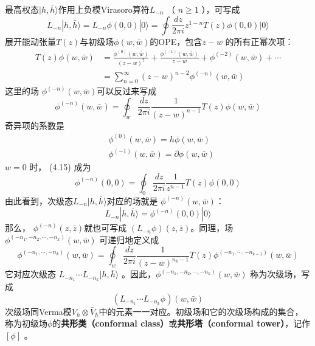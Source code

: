 最高权态$ |h,\bar{h}\rangle $作用上负模Virasoro算符$ L_{-n}$ （ $n\geq 1$ ），可写成
\begin{equation}
L_{-n}|h, \bar{h}\rangle=L_{-n} \phi(0,0)|0\rangle=\oint \frac{d z}{2 \pi i} z^{1-n} T(z) \phi(0,0)|0\rangle
\end{equation}
展开能动张量$ T(z) $与初级场$ \phi(w,\bar{w}) $的OPE，包含$ z-w$ 的所有正幂次项：
\begin{equation}
	\begin{aligned} T(z) \phi(w, \bar{w}) &=\frac{\phi^{(0)}(w, \bar{w})}{(z-w)^{2}}+\frac{\phi^{(-1)}(w, \bar{w})}{z-w}+\phi^{(-2)}(w, \bar{w})+\cdots \\ &=\sum_{n=0}^{\infty}(z-w)^{n-2} \phi^{(-n)}(w, \bar{w}) \end{aligned}
\end{equation}
这里的场 $\phi^{(-n)}(w, \bar{w}) $可以反过来写成
\begin{equation}
	\phi^{(-n)}(w, \bar{w})=\oint_{w} \frac{d z}{2 \pi i} \frac{1}{(z-w)^{n-1}} T(z) \phi(w, \bar{w})
\end{equation}
奇异项的系数是
\begin{align} &\phi^{(0)}(w, \bar{w})=h \phi(w, \bar{w})\\ &\phi^{(-1)}(w, \bar{w})=\partial \phi(w, \bar{w}) \end{align}
$w=0$ 时， (4.15) 成为
\begin{equation}
	\phi^{(-n)}(0,0)=\oint_{0} \frac{d z}{2 \pi i} \frac{1}{z^{n-1}} T(z) \phi(0,0)
\end{equation}
由此看到，次级态$ L_{-n}|h, \bar{h}\rangle$对应的场就是 $\phi^{(-n)}(w, \bar{w}) $：
\begin{equation}
	L_{-n}|h, \bar{h}\rangle=\phi^{(-n)}(0,0)|0\rangle
\end{equation}
那么， $\phi^{(-n)}(z, \bar{z}) $就也可写成 $\left(L_{-n} \phi\right)(z, \bar{z}) $。同理，场$ \phi^{\left(-n_{1},-n_{2}, \cdots,-n_{k}\right)}(w, \bar{w})$ 可递归地定义成
\begin{equation}
	\phi^{\left(-n_{1}, \cdots,-n_{k}\right)}(w, \bar{w})=\oint_{w} \frac{d z}{2 \pi i} \frac{1}{(z-w)^{n_{k}-1}} T(z) \phi^{\left(-n_{1}, \cdots,-n_{k-1}\right)}(w, \bar{w})
\end{equation}
它对应次级态 $L_{-n_{1}} \cdots L_{-n_{k}}|h, \bar{h}\rangle$ 。因此，$\phi^{\left(-n_{1},-n_{2}, \cdots,-n_{k}\right)}(w, \bar{w})$ 称为次级场，写成$$\left(L_{-n_{1}} \cdots L_{-n_{k}} \phi\right)(w, \bar{w})$$ 次级场同Verma模$ V_{h} \otimes \bar{V}_{\bar{h}} $中的元素一一对应。初级场和它的次级场构成的集合，称为初级场$ \phi $的\textbf{共形类（conformal class）}或\textbf{共形塔（conformal tower）}，记作$ [\phi]$ 。

